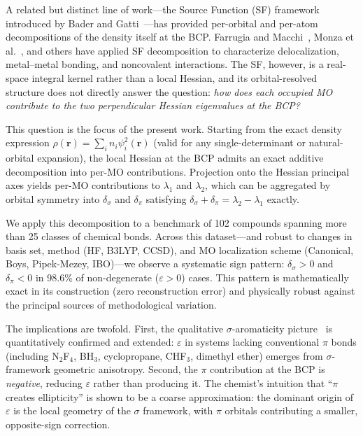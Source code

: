 \documentclass[twoside,natbib]{svjour3}
\newcommand{\delsg}{\delta_{\sigma}}
\newcommand{\delpi}{\delta_{\pi}}
\newcommand{\eps}{\varepsilon}
\begin{document}
A related but distinct line of work---the Source Function (SF)
framework introduced by Bader and Gatti~\citep{BaderGatti1998}---has
provided per-orbital and per-atom decompositions of the density
itself at the BCP. Farrugia and Macchi~\citep{Farrugia2009},
Monza et al.~\citep{Monza2011}, and others have applied SF
decomposition to characterize delocalization, metal--metal bonding,
and noncovalent interactions. The SF, however, is a real-space
integral kernel rather than a local Hessian, and its
orbital-resolved structure does not directly answer the
question: \emph{how does each occupied MO contribute to the two
perpendicular Hessian eigenvalues at the BCP?}

This question is the focus of the present work. Starting from the
exact density expression $\rho(\mathbf{r}) = \sum_i n_i \psi_i^2(\mathbf{r})$
(valid for any single-determinant or natural-orbital expansion), the
local Hessian at the BCP admits an exact additive decomposition into
per-MO contributions. Projection onto the Hessian principal axes
yields per-MO contributions to $\lambda_1$ and $\lambda_2$, which
can be aggregated by orbital symmetry into $\delsg$ and $\delpi$
satisfying $\delsg + \delpi = \lambda_2 - \lambda_1$ exactly.

We apply this decomposition to a benchmark of 102 compounds spanning
more than 25 classes of chemical bonds. Across this dataset---and
robust to changes in basis set, method (HF, B3LYP, CCSD), and MO
localization scheme (Canonical, Boys, Pipek-Mezey, IBO)---we observe
a systematic sign pattern: $\delsg > 0$ and $\delpi < 0$ in 98.6\% of
non-degenerate ($\eps > 0$) cases. This pattern is mathematically
exact in its construction (zero reconstruction error) and physically
robust against the principal sources of methodological variation.

The implications are twofold. First, the qualitative
$\sigma$-aromaticity picture~\citep{Walsh1947,Cremer1988,Brown2009}
is quantitatively confirmed and extended: $\eps$ in systems lacking
conventional $\pi$ bonds (including N$_2$F$_4$, BH$_3$,
cyclopropane, CHF$_3$, dimethyl ether) emerges from $\sigma$-framework
geometric anisotropy. Second, the $\pi$ contribution at the BCP is
\emph{negative}, reducing $\eps$ rather than producing it. The
chemist's intuition that ``$\pi$ creates ellipticity'' is shown to
be a coarse approximation: the dominant origin of $\eps$ is the
local geometry of the $\sigma$ framework, with $\pi$ orbitals
contributing a smaller, opposite-sign correction.
\end{document}
